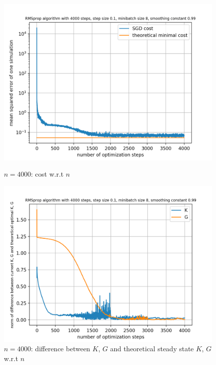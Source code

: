 \documentclass{article}
\begin{document}
\begin{figure}[h!]
	\centering
	\begin{minipage}[t]{.27\paperwidth}
		\centering
		\includegraphics[width=1.0\textwidth]{Figures/sgd_4000.png}
		\caption{$n=4000$: cost w.r.t $n$\label{fig:sgd_4000}}
	\end{minipage}%
	\begin{minipage}[t]{.27\paperwidth}
		\centering
		\includegraphics[width=1.0\textwidth]{Figures/diff_4000.png}
		\caption{$n=4000$: difference between $K$, $G$ and theoretical steady state $K$, $G$ w.r.t $n$\label{fig:diff_4000}}
	\end{minipage}%
	\begin{minipage}[t]{.27\paperwidth}

\end{minipage}
\end{figure}
\end{document}
